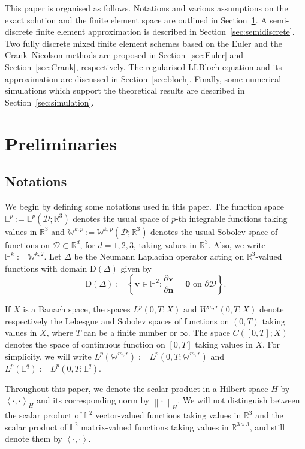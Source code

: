 \documentclass[11pt, reqno]{amsart}
\theoremstyle{definition}
\theoremstyle{remark}
\numberwithin{equation}{section}
\newcommand{\bff}{\boldsymbol}
\newcommand{\bb}{\mathbb}
\newcommand{\norm}[2]{\left\|{#1}\right\|_{#2}}
\newcommand{\inpro}[2]{\left\langle#1,#2\right\rangle}
\begin{document}
\par \medskip

This paper is organised as follows. Notations and various assumptions on the exact solution and the finite element space are outlined in Section~\ref{sec:formula}. A semi-discrete finite element approximation is described in Section~\ref{sec:semidiscrete}. Two fully discrete mixed finite element schemes based on the Euler and the Crank--Nicolson methods are proposed in Section~\ref{sec:Euler} and Section~\ref{sec:Crank}, respectively. The regularised LLBloch equation and its approximation are discussed in Section~\ref{sec:bloch}. Finally, some numerical simulations which support the theoretical results are described in Section~\ref{sec:simulation}.


\section{Preliminaries}\label{sec:formula}

\subsection{Notations}

We begin by defining some notations used in this paper. The function space $\bb{L}^p := \bb{L}^p(\mathscr{D}; \bb{R}^3)$ denotes the usual space of $p$-th integrable functions taking values in $\bb{R}^3$ and $\bb{W}^{k,p} := \bb{W}^{k,p}(\mathscr{D}; \bb{R}^3)$ denotes the usual Sobolev space of 
functions on $\mathscr{D} \subset \bb{R}^d$, for $d=1,2,3$, taking values in $\bb{R}^3$. Also, we write $\bb{H}^k := \bb{W}^{k,2}$. Let $\Delta$ be the Neumann Laplacian operator acting on $\bb{R}^3$-valued functions with domain $\mathrm{D}(\Delta)$ given by
\begin{equation*}
	\mathrm{D}(\Delta):= \left\{\bff{v}\in \bb{H}^2 : \frac{\partial \bff{v}}{\partial \bff{n}} = \bff{0} \text{ on } \partial\mathscr{D} \right\}.
\end{equation*}

If $X$ is a Banach space, the spaces $L^p(0,T;X)$ and $W^{m,r}(0,T;X)$ denote respectively the Lebesgue and Sobolev spaces of functions on $(0,T)$ taking values in $X$, where $T$ can be a finite number or $\infty$. The space $C([0,T];X)$ denotes the space of continuous function on $[0,T]$ taking values in $X$. For simplicity, we will write $L^p(\bb{W}^{m,r}) := L^p(0,T; \bb{W}^{m,r})$ and $L^p(\bb{L}^q) := L^p(0,T; \bb{L}^q)$. 

Throughout this paper, we denote the scalar product in a Hilbert space $H$ by $\inpro{ \cdot}{ \cdot}_H$ and its corresponding norm by $\norm{\cdot}{H}$. We will not distinguish between the scalar product of $\bb{L}^2$ vector-valued functions taking values in $\bb{R}^3$ and the scalar product of $\bb{L}^2$ matrix-valued functions taking values in $\bb{R}^{3\times 3}$, and still denote them by $\inpro{\cdot}{\cdot}$.
\end{document}
